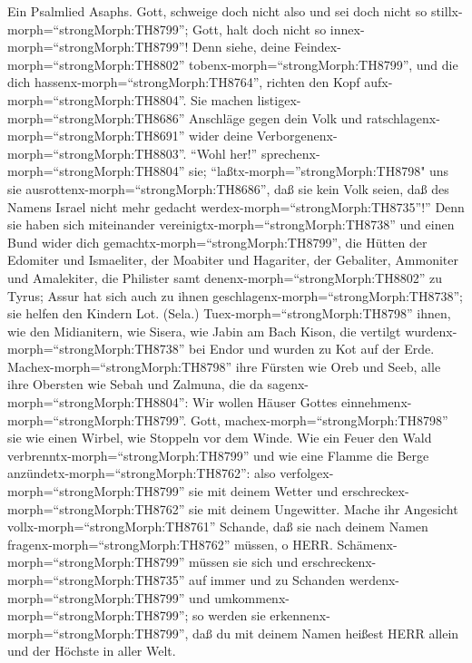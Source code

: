  Ein Psalmlied Asaphs. Gott, schweige doch nicht also und
sei doch nicht so stillx-morph=``strongMorph:TH8799''; Gott, halt doch
nicht so innex-morph=``strongMorph:TH8799''!  Denn siehe,
deine Feindex-morph=``strongMorph:TH8802''
tobenx-morph=``strongMorph:TH8799'', und die dich
hassenx-morph=``strongMorph:TH8764'', richten den Kopf
aufx-morph=``strongMorph:TH8804''.  Sie machen
listigex-morph=``strongMorph:TH8686'' Anschläge gegen dein Volk und
ratschlagenx-morph=``strongMorph:TH8691'' wider deine
Verborgenenx-morph=``strongMorph:TH8803''.  ``Wohl her!''
sprechenx-morph=``strongMorph:TH8804'' sie;
``laßtx-morph=''strongMorph:TH8798" uns sie
ausrottenx-morph=``strongMorph:TH8686'', daß sie kein Volk seien, daß
des Namens Israel nicht mehr gedacht
werdex-morph=``strongMorph:TH8735''!''  Denn sie haben sich
miteinander vereinigtx-morph=``strongMorph:TH8738'' und einen Bund wider
dich gemachtx-morph=``strongMorph:TH8799'',  die Hütten der
Edomiter und Ismaeliter, der Moabiter und Hagariter,  der
Gebaliter, Ammoniter und Amalekiter, die Philister samt
denenx-morph=``strongMorph:TH8802'' zu Tyrus;  Assur hat
sich auch zu ihnen geschlagenx-morph=``strongMorph:TH8738''; sie helfen
den Kindern Lot. (Sela.)  Tuex-morph=``strongMorph:TH8798''
ihnen, wie den Midianitern, wie Sisera, wie Jabin am Bach Kison,
 die vertilgt wurdenx-morph=``strongMorph:TH8738'' bei
Endor und wurden zu Kot auf der Erde. 
Machex-morph=``strongMorph:TH8798'' ihre Fürsten wie Oreb und Seeb, alle
ihre Obersten wie Sebah und Zalmuna,  die da
sagenx-morph=``strongMorph:TH8804'': Wir wollen Häuser Gottes
einnehmenx-morph=``strongMorph:TH8799''.  Gott,
machex-morph=``strongMorph:TH8798'' sie wie einen Wirbel, wie Stoppeln
vor dem Winde.  Wie ein Feuer den Wald
verbrenntx-morph=``strongMorph:TH8799'' und wie eine Flamme die Berge
anzündetx-morph=``strongMorph:TH8762'':  also
verfolgex-morph=``strongMorph:TH8799'' sie mit deinem Wetter und
erschreckex-morph=``strongMorph:TH8762'' sie mit deinem Ungewitter.
 Mache ihr Angesicht vollx-morph=``strongMorph:TH8761''
Schande, daß sie nach deinem Namen fragenx-morph=``strongMorph:TH8762''
müssen, o HERR.  Schämenx-morph=``strongMorph:TH8799''
müssen sie sich und erschreckenx-morph=``strongMorph:TH8735'' auf immer
und zu Schanden werdenx-morph=``strongMorph:TH8799'' und
umkommenx-morph=``strongMorph:TH8799'';  so werden sie
erkennenx-morph=``strongMorph:TH8799'', daß du mit deinem Namen heißest
HERR allein und der Höchste in aller Welt.

